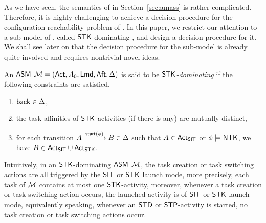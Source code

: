As we have seen, the semantics of {\AMASS} in Section~\ref{sec:amass} is rather complicated. Therefore, it is highly challenging to achieve a decision procedure for the configuration reachability problem of {\AMASS}. In this paper, we restrict our attention to a sub-model of {\AMASS}, called $\mathsf{STK}$-dominating {\AMASS}, and design a decision procedure for it. We shall see later on that the decision procedure for the sub-model is already quite involved and requires nontrivial novel ideas.  


\begin{definition} \label{def:stk-amass}
    An $\textsf{ASM}$  ${\mathcal{M} } = ({\sf Act}, A_0, {\sf Lmd}, {\sf Aft}, \Delta)$ is said to be \emph{$\mathsf{STK}$-dominating} if the following constraints are satisfied.
    \begin{enumerate}
		\item ${\mathsf{back} }\in\Delta$,
        \item the task affinities of ${\sf STK}$-activities (if there is any) are mutually distinct,
        \item for each transition $A \xrightarrow{{\mathsf{start} }(\phi)} B\in\Delta$ such that $A \in {\sf Act}_{\sf SIT}$ or $\phi\models {\sf NTK}$, we have $B \in {\sf Act}_{{\sf SIT}} \cup {\sf Act}_{{\sf STK}}$.
    \end{enumerate}
\end{definition}
Intuitively, in an $\mathsf{STK}$-dominating $\textsf{ASM}$ ${\mathcal{M} }$, the task creation or task switching actions are all triggered by the ${\sf SIT}$ or ${\sf STK}$ launch mode, more precisely,  
each task of ${\mathcal{M} }$ contains at most one $\mathsf{STK}$-activity, moreover, whenever a task creation or task switching action occurs, the launched activity is of ${\sf SIT}$ or ${\sf STK}$ launch mode, equivalently speaking, 
whenever an ${\sf STD}$ or ${\sf STP}$-activity is started, no task creation or task switching actions occur.  %

